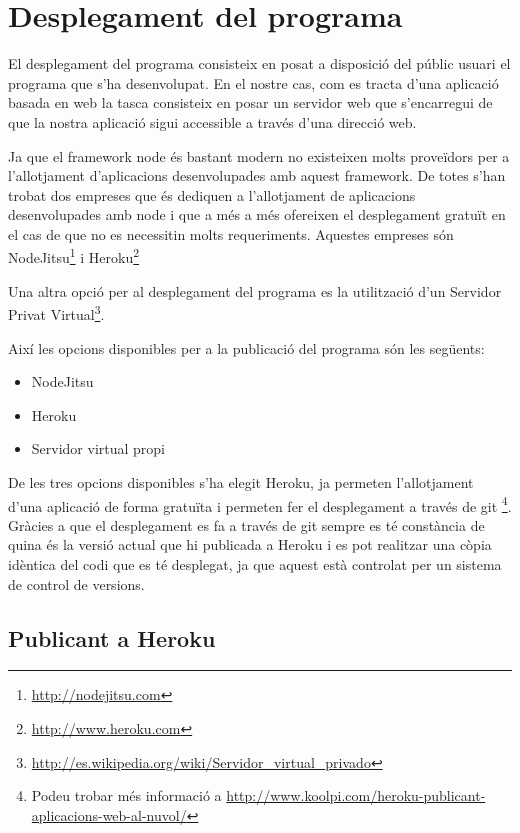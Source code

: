 \chapter{Desplegament del programa}
\label{chap:desplegament}

El desplegament del programa consisteix en posat a disposició del públic usuari el programa que s'ha desenvolupat. En el nostre cas, com es tracta d'una aplicació basada en web la tasca consisteix en posar un servidor web que s'encarregui de que la nostra aplicació sigui accessible a través d'una direcció web. 

Ja que el framework node és bastant modern no existeixen molts proveïdors per a l'allotjament d'aplicacions desenvolupades amb aquest framework. De totes s'han trobat dos empreses que és dediquen a l'allotjament de aplicacions desenvolupades amb node i que a més a més ofereixen el desplegament gratuït en el cas de que no es necessitin molts requeriments. Aquestes empreses són NodeJitsu\footnote{\url{http://nodejitsu.com}} i Heroku\footnote{\url{http://www.heroku.com}}

Una altra opció per al desplegament del programa es la utilització d'un Servidor Privat Virtual\footnote{\url{http://es.wikipedia.org/wiki/Servidor_virtual_privado}}. 

Així les opcions disponibles per a la publicació del programa són les següents: 

\begin{itemize}
\item{NodeJitsu}
\item{Heroku}
\item{Servidor virtual propi}
\end{itemize}


De les tres opcions disponibles s'ha elegit Heroku, ja permeten l'allotjament d'una aplicació de forma gratuïta i permeten fer el desplegament a través de git \footnote{Podeu trobar més informació a \url{http://www.koolpi.com/heroku-publicant-aplicacions-web-al-nuvol/} }. Gràcies a que el desplegament es fa a través de git sempre es té constància de quina és la versió actual que hi publicada a Heroku i es pot realitzar una còpia idèntica del codi que es té desplegat, ja que aquest està controlat per un sistema de control de versions.

\section{Publicant a Heroku}

